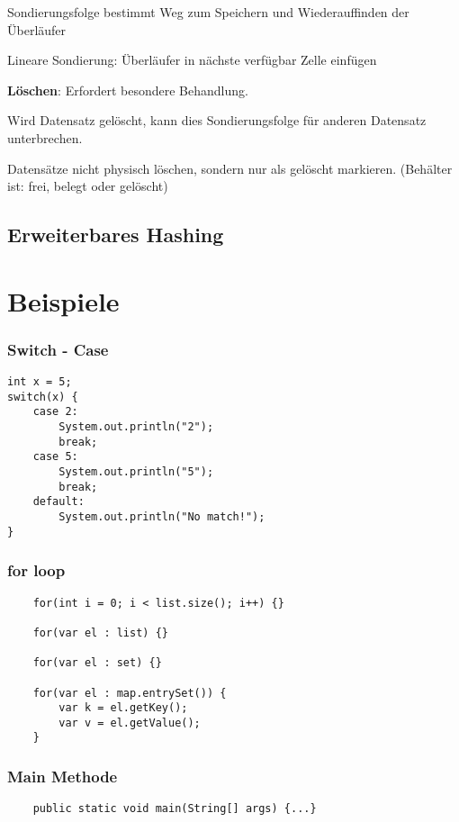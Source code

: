 \begin{multicols*}{5}
		Sondierungsfolge bestimmt Weg zum Speichern und Wiederauffinden der Überläufer
		
		Lineare Sondierung: Überläufer in nächste verfügbar Zelle einfügen
		
		\textbf{Löschen}: Erfordert besondere Behandlung.
		
		Wird Datensatz gelöscht, kann dies Sondierungsfolge für anderen Datensatz unterbrechen.
		
		Datensätze nicht physisch löschen, sondern nur als gelöscht markieren. (Behälter ist: frei, belegt oder gelöscht)
		
	\subsection{Erweiterbares Hashing}

\columnbreak
\section{Beispiele}

	\subsubsection{Switch - Case}
	\begin{lstlisting}
int x = 5; 
switch(x) {
	case 2: 
		System.out.println("2"); 
		break;
	case 5: 
		System.out.println("5"); 
		break;
	default: 
		System.out.println("No match!"); 
}
	\end{lstlisting}

	\subsubsection{for loop}
	\begin{lstlisting}
	for(int i = 0; i < list.size(); i++) {}
	
	for(var el : list) {}
	
	for(var el : set) {}
	
	for(var el : map.entrySet()) {
		var k = el.getKey();
		var v = el.getValue();
	}
	\end{lstlisting}

	\subsubsection{Main Methode}
	\begin{lstlisting}
	public static void main(String[] args) {...}	
	\end{lstlisting}


\end{multicols*}
